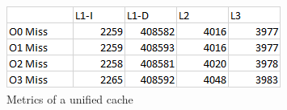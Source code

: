 \documentclass{article}
\begin{document}
        \begin{figure}[H]
            \label{fig:dry_table}
            \begin{center}
                \includegraphics[width=\textwidth]{dry_table.png}
                \caption{Metrics of a unified cache}
            \end{center}
        \end{figure}

\end{document}

